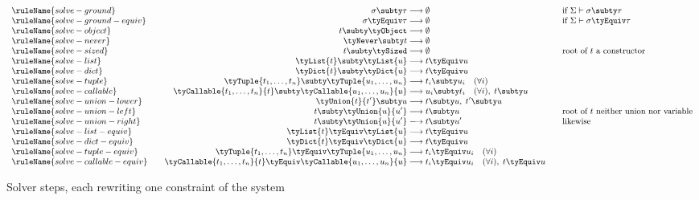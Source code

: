 \begin{figure}
\flushleft {}
\[
\small
\begin{array}{l@{\qquad}r@{\;\longrightarrow\;}l@{\qquad}l}
\ruleName{solve-ground} & \sigma \subty \tau & \emptyset & \text{if } \Sigma \vdash \sigma \subty \tau \\
\ruleName{solve-ground-equiv} & \sigma \tyEquiv \tau & \emptyset & \text{if } \Sigma \vdash \sigma \tyEquiv \tau \\
\ruleName{solve-object} & t \subty \tyObject & \emptyset & \\
\ruleName{solve-never} & \tyNever \subty t & \emptyset & \\
\ruleName{solve-sized} & t \subty \tySized & \emptyset & \text{root of } t \text{ a constructor} \\
\ruleName{solve-list} & \tyList{t} \subty \tyList{u} & t \tyEquiv u & \\
\ruleName{solve-dict} & \tyDict{t} \subty \tyDict{u} & t \tyEquiv u & \\
\ruleName{solve-tuple} & \tyTuple{t_1, \ldots, t_n} \subty \tyTuple{u_1, \ldots, u_n} & t_i \subty u_i \quad (\forall i) & \\
\ruleName{solve-callable} & \tyCallable{t_1, \ldots, t_n}{t} \subty \tyCallable{u_1, \ldots, u_n}{u} & u_i \subty t_i \quad (\forall i), \; t \subty u & \\
\ruleName{solve-union-lower} & \tyUnion{t}{t'} \subty u & t \subty u, \; t' \subty u & \\
\ruleName{solve-union-left} & t \subty \tyUnion{u}{u'} & t \subty u & \text{root of } t \text{ neither union nor variable} \\
\ruleName{solve-union-right} & t \subty \tyUnion{u}{u'} & t \subty u' & \text{likewise} \\
\ruleName{solve-list-equiv} & \tyList{t} \tyEquiv \tyList{u} & t \tyEquiv u & \\
\ruleName{solve-dict-equiv} & \tyDict{t} \tyEquiv \tyDict{u} & t \tyEquiv u & \\
\ruleName{solve-tuple-equiv} & \tyTuple{t_1, \ldots, t_n} \tyEquiv \tyTuple{u_1, \ldots, u_n} & t_i \tyEquiv u_i \quad (\forall i) & \\
\ruleName{solve-callable-equiv} & \tyCallable{t_1, \ldots, t_n}{t} \tyEquiv \tyCallable{u_1, \ldots, u_n}{u} & t_i \tyEquiv u_i \quad (\forall i), \; t \tyEquiv u & \\
\end{array}
\]
\caption{Solver steps, each rewriting one constraint of the system}
\label{fig:graduality-solver}
\end{figure}

